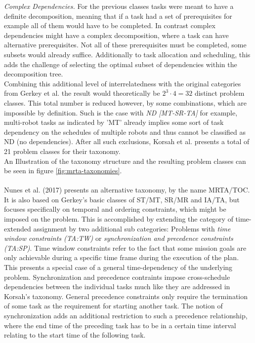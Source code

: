 \textit{Complex Dependencies.} For the previous classes tasks were meant to have a definite decomposition, meaning that if a task had a set of prerequisites for example all of them would have to be completed. In contrast complex dependencies might have a complex decomposition, where a task can have alternative prerequisites. Not all of these prerequisites must be completed, some subsets would already suffice. Additionally to task allocation and scheduling, this adds the challenge of selecting the optimal subset of dependencies within the decomposition tree.\\ 
Combining this additional level of interrelatedness with the original categories from Gerkey et al. the result would theoretically be $2^3 \cdot 4 = 32$ distinct problem classes. This total number is reduced however, by some combinations, which are impossible by definition. Such is the case with \textit{ND [MT-SR-TA]} for example, multi-robot tasks as indicated by 'MT' already implies some sort of task  dependency on the schedules of multiple robots and thus cannot be classified as ND (no dependencies). After all such exclusions, Korsah et al. presents a total of 21 problem classes for their taxonomy.\\
An Illustration of the taxonomy structure and the resulting problem classes can be seen in figure \ref{fig:mrta-taxonomies}.
\\ \\
Nunes et al. (2017) \cite{nunes_taxonomy_2017} presents an alternative taxonomy, by the name MRTA/TOC. It is also based on Gerkey's basic classes of ST/MT, SR/MR and IA/TA, but focuses specifically on temporal and ordering constraints, which might be imposed on the problem. This is accomplished by extending the category of time-extended assignment by two additional sub categories: Problems with \textit{time window constraints (TA:TW)} or \textit{synchronization and precedence constraints (TA:SP)}. Time window constraints refer to the fact that some mission goals are only achievable during a specific time frame during the execution of the plan. This presents a special case of a general time-dependency of the underlying problem. Synchronization and precedence contraints impose cross-schedule dependencies between the individual tasks much like they are addressed in Korsah's taxonomy. General precedence constraints only require the termination of some task as the requirement for starting another task. The notion of synchronization adds an additional restriction to such a precedence relationship, where the end time of the preceding task has to be in a certain time interval relating to the start time of the following task.

